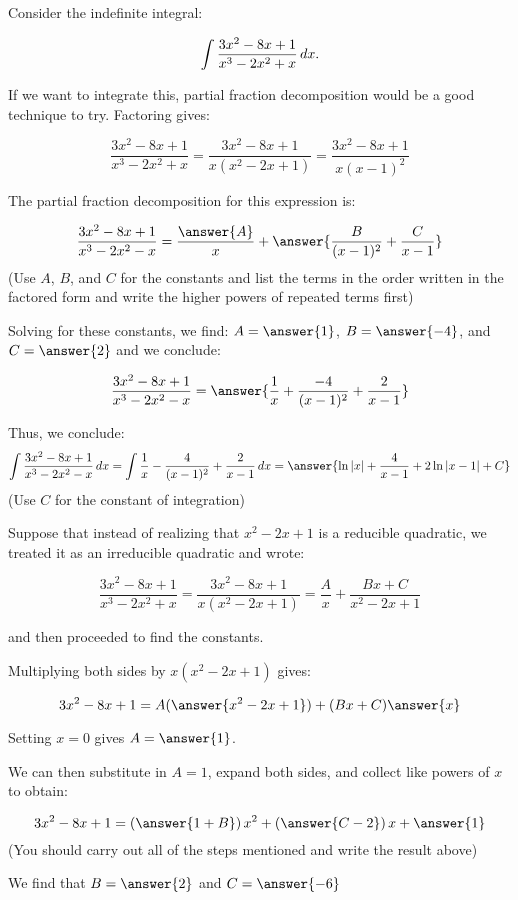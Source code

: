 \documentclass{ximera}
\author{Jim Talamo}
\begin{document}
\begin{exercise}
Consider the indefinite integral: 

\[
\int \frac{3x^2-8x+1}{x^3-2x^2+x} \mathop{}\!d x.
\]

If we want to integrate this, partial fraction decomposition would be a good technique to try.  Factoring gives:

\[
\frac{3x^2-8x+1}{x^3-2x^2+x}  =\frac{3x^2-8x+1}{x(x^2-2x+1)} =\frac{3x^2-8x+1}{x(x-1)^2} 
\]  

The partial fraction decomposition for this expression is:

\[
\frac{3x^2-8x+1}{x^3-2x^2-x}= \frac{\answer{A}}{x}+\answer{\frac{B}{(x-1)^2}+\frac{C}{x-1}}
\]
(Use $A$, $B$, and $C$ for the constants and list the terms in the order written in the factored form and write the higher powers of repeated terms first)

Solving for these constants, we find: $A = \answer{1}$, $B=\answer{-4}$, and $C=\answer{2}$ and we conclude:

\[
\frac{3x^2-8x+1}{x^3-2x^2-x}= \answer{\frac{1}{x}+\frac{-4}{(x-1)^2}+\frac{2}{x-1}}
\]

Thus, we conclude:
\[
\int \frac{3x^2-8x+1}{x^3-2x^2-x} \d x = \int \frac{1}{x}-\frac{4}{(x-1)^2}+\frac{2}{x-1} \d x = \answer{\ln|x|+\frac{4}{x-1}+2\ln|x-1| +C}
\]
(Use $C$ for the constant of integration)


\begin{exercise}
Suppose that instead of realizing that $x^2-2x+1$ is a reducible quadratic, we treated it as an irreducible quadratic and wrote:


\[
\frac{3x^2-8x+1}{x^3-2x^2+x}  =\frac{3x^2-8x+1}{x(x^2-2x+1)} =\frac{A}{x}+\frac{Bx+C}{x^2-2x+1} 
\]  

and then proceeded to find the constants.

Multiplying both sides by $x(x^2-2x+1)$ gives:

\[
3x^2-8x+1 = A(\answer{x^2-2x+1})+(Bx+C)\answer{x}
\]  

\begin{exercise}
Setting $x=0$ gives $A=\answer{1}$.

We can then substitute in $A=1$, expand both sides, and collect like powers of $x$ to obtain:

\[
3x^2-8x+1 = \left(\answer{1+B}\right)x^2+\left(\answer{C-2}\right)x+\answer{1}
\]
(You should carry out all of the steps mentioned and write the result above)

We find that $B=\answer{2}$ and $C=\answer{-6}$


\end{exercise}
\end{exercise}
\end{exercise}
\end{document}
